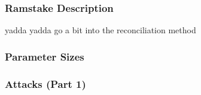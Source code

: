 \documentclass[11pt,t]{beamer}
\begin{document}
\begin{frame}\frametitle{Ramstake Description}

yadda yadda go a bit into the reconciliation method
\end{frame}

\begin{frame}\frametitle{Parameter Sizes}
\end{frame}

\begin{frame}\frametitle{Attacks (Part 1)}

\end{frame}
\end{document}
